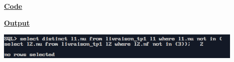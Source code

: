 \newpage
{}

\textbf{\underline{Code}}


\vspace{1cm}
\textbf{\underline{Output}}
\vspace{1cm}
\begin{center}
    \includegraphics[width=0.9\textwidth]{Questions/q23/q23.png}
\end{center}


